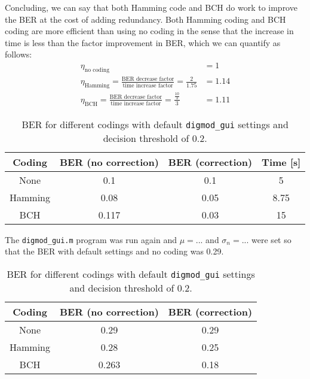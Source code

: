 \documentclass[11pt,titlepage]{report}
\begin{document}
Concluding, we can say that both Hamming code and BCH do work to improve the BER at the cost of adding redundancy. Both Hamming coding and BCH coding are more efficient than using no coding in the sense that the increase in time is less than the factor improvement in BER, which we can quantify as follows:
\begin{align*}
\eta_{\text{no coding}}&=1\\
\eta_{\text{Hamming}}=\frac{\text{BER decrease factor}}{\text{time increase factor}}=\frac{2}{1.75}&=1.14\\
\eta_{\text{BCH}}=\frac{\text{BER decrease factor}}{\text{time increase factor}}=\frac{\frac{10}{3}}{3}&=1.11
\end{align*}
\begin{table}[H]
	\centering
	\caption{BER for different codings with default \texttt{digmod\_gui} settings and decision threshold of 0.2.}
	\label{tab:task4-diff-coding}
	\begin{tabular}{c c c c}
		\hline\hline
		Coding & BER (no correction) & BER (correction) & Time [s] \\
		\hline
		None & 0.1 & 0.1 & 5\\
		Hamming & 0.08 & 0.05 & 8.75 \\
		BCH & 0.117 & 0.03 & 15\\
		\hline
	\end{tabular}
\end{table}

The \texttt{digmod\_gui.m} program was run again and $\mu=...$ and $\sigma_n=...$ were set so that the BER with default settings and no coding was 0.29.

\begin{table}[H]
	\centering
	\caption{BER for different codings with default \texttt{digmod\_gui} settings and decision threshold of 0.2.}
	\label{tab:task4-diff-coding-mu-sigma}
	\begin{tabular}{c c c}
		\hline\hline
		Coding & BER (no correction) & BER (correction)\\
		\hline
		None & 0.29 & 0.29\\
		Hamming & 0.28 & 0.25 \\
		BCH & 0.263 & 0.18\\
		\hline
	\end{tabular}
\end{table}
\end{document}
